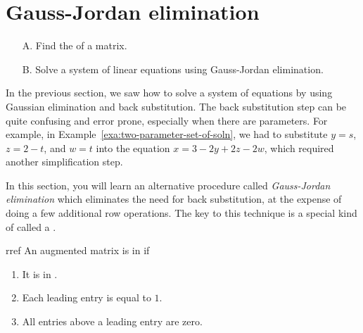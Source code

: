 \section{Gauss-Jordan elimination}

\begin{outcome}
  \begin{enumerate}
  \item[A.] Find the {\rref} of a matrix.
    
  \item[B.] Solve a system of linear equations using Gauss-Jordan elimination.
  \end{enumerate}
\end{outcome}

In the previous section, we saw how to solve a system of equations by
using Gaussian elimination and back substitution. The back
substitution step can be quite confusing and error prone, especially
when there are parameters. For example, in
Example~\ref{exa:two-parameter-set-of-soln}, we had to substitute $y=s$,
$z=2-t$, and $w=t$ into the equation $x=3-2y+2z-2w$, which required
another simplification step.

In this section, you will learn an alternative procedure called {\em
  Gauss-Jordan elimination} which eliminates the need for back
substitution, at the expense of doing a few additional row operations.
The key to this technique is a special kind of {\ef} called a
{\em {\rref}}.

\begin{definition}{\Rref}{rref}
  An augmented matrix is in \textbf{\rref}\eindex{\rref} if
  
  \begin{enumerate}
  \item It is in {\ef}.
    
  \item Each leading entry is equal to $1$.
    
  \item All entries above a leading entry are zero.
  \end{enumerate}
\end{definition}

